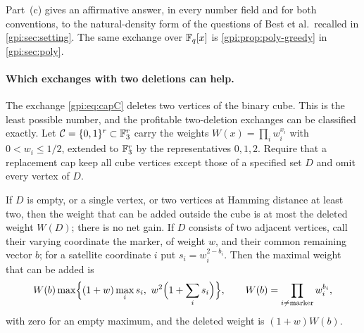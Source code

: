 Part~(c) gives an affirmative answer, in every number field and for both conventions, to the
natural-density form of the questions of Best et al.\ recalled in \cref{gpi:sec:setting}.
The same exchange over $\mathbb{F}_q[x]$ is \cref{gpi:prop:poly-greedy} in \cref{gpi:sec:poly}.

\paragraph{Which exchanges with two deletions can help.}
The exchange \eqref{gpi:eq:capC} deletes two vertices of the binary cube. This is the least
possible number, and the profitable two-deletion exchanges can be classified exactly. Let
$\mathcal C=\{0,1\}^r\subset\mathbb{F}_3^r$ carry the weights $W(x)=\prod_iw_i^{x_i}$ with
$0<w_i\le1/2$, extended to $\mathbb{F}_3^r$ by the representatives $0,1,2$. Require that a
replacement cap keep all cube vertices except those of a specified set $D$ and omit every
vertex of $D$.

\begin{theorem}\label{gpi:thm:edge}
If $D$ is empty, or a single vertex, or two vertices at Hamming distance at least two, then
the weight that can be added outside the cube is at most the deleted weight $W(D)$; there is
no net gain. If $D$ consists of two adjacent vertices, call their varying coordinate the
marker, of weight $w$, and their common remaining vector $b$; for a satellite coordinate $i$
put $s_i=w_i^{2-b_i}$. Then the maximal weight that can be added is
\[
 W(b)\max\Bigl\{(1+w)\max_is_i,\ w^2\Bigl(1+\sum_is_i\Bigr)\Bigr\},\qquad
 W(b)=\prod_{i\ne\mathrm{marker}}w_i^{b_i},
\]
with zero for an empty maximum, and the deleted weight is $(1+w)W(b)$.
\end{theorem}

